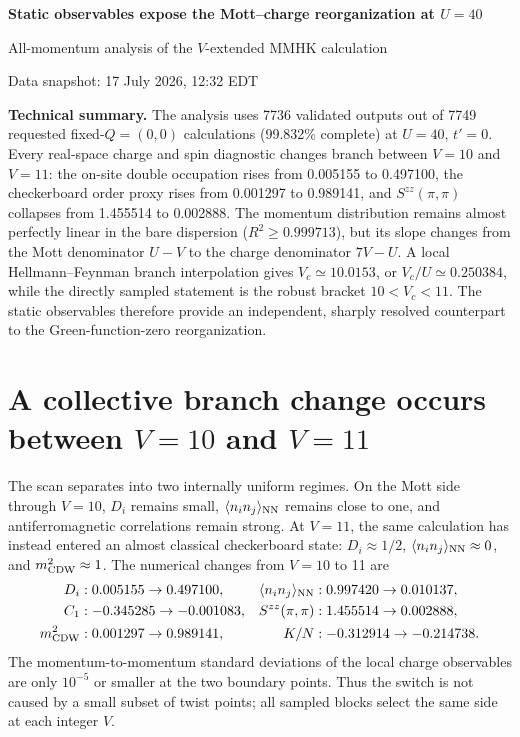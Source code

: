\documentclass[10pt]{article}
\begin{document}
\begin{center}
{\LARGE\bfseries Static observables expose the Mott--charge reorganization at $U=40$\par}
\vspace{0.35em}
{\large All-momentum analysis of the $V$-extended MMHK calculation\par}
\vspace{0.4em}
{\small Data snapshot: 17 July 2026, 12:32 EDT}
\end{center}

\vspace{0.5em}
\colorbox{softgray}{\parbox{0.965\linewidth}{
\textbf{Technical summary.}
The analysis uses 7736 validated outputs out of 7749 requested
fixed-$Q=(0,0)$ calculations (99.832\% complete) at $U=40$, $t'=0$.
Every real-space charge and spin diagnostic changes branch between $V=10$ and $V=11$:
the on-site double occupation rises from 0.005155 to 0.497100, the checkerboard
order proxy rises from 0.001297 to 0.989141, and
$S^{zz}(\pi,\pi)$ collapses from 1.455514 to 0.002888.
The momentum distribution remains almost perfectly linear in the bare dispersion
($R^2\ge 0.999713$), but its slope changes from the Mott denominator $U-V$ to the
charge denominator $7V-U$.  A local Hellmann--Feynman branch interpolation gives
$V_c\simeq 10.0153$, or $V_c/U\simeq 0.250384$, while the directly sampled statement
is the robust bracket $10<V_c<11$.  The static observables therefore provide an
independent, sharply resolved counterpart to the Green-function-zero reorganization.}}

\section{A collective branch change occurs between $V=10$ and $V=11$}

The scan separates into two internally uniform regimes.  On the Mott side through
$V=10$, $D_i$ remains small, $\langle n_i n_j\rangle_{\rm NN}$ remains close to one,
and antiferromagnetic correlations remain strong.  At $V=11$, the same calculation
has instead entered an almost classical checkerboard state: $D_i\approx 1/2$,
$\langle n_i n_j\rangle_{\rm NN}\approx0$, and $m_{\rm CDW}^2\approx1$.
The numerical changes from $V=10$ to 11 are
\begin{align*}
D_i &: 0.005155 \rightarrow 0.497100, &
\langle n_i n_j\rangle_{\rm NN} &: 0.997420 \rightarrow 0.010137,\\
C_1 &: -0.345285 \rightarrow -0.001083, &
S^{zz}(\pi,\pi) &: 1.455514 \rightarrow 0.002888,\\
m_{\rm CDW}^2 &: 0.001297 \rightarrow 0.989141, &
K/N &: -0.312914 \rightarrow -0.214738.
\end{align*}
The momentum-to-momentum standard deviations of the local charge observables are
only $10^{-5}$ or smaller at the two boundary points.  Thus the switch is not caused
by a small subset of twist points; all sampled blocks select the same side at each
integer $V$.
\end{document}
